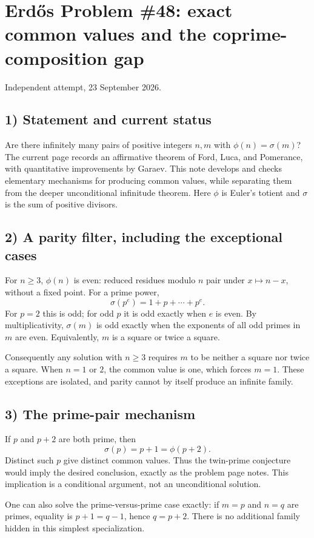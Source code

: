 \section{Erd\H{o}s Problem \#48: exact common values and the coprime-composition gap}
\noindent Independent attempt, 23 September 2026.

\subsection*{1) Statement and current status}
Are there infinitely many pairs of positive integers $n,m$ with $\phi(n)=\sigma(m)$? The current page records an affirmative theorem of Ford, Luca, and Pomerance, with quantitative improvements by Garaev. This note develops and checks elementary mechanisms for producing common values, while separating them from the deeper unconditional infinitude theorem. Here $\phi$ is Euler's totient and $\sigma$ is the sum of positive divisors.

\subsection*{2) A parity filter, including the exceptional cases}
For $n\ge3$, $\phi(n)$ is even: reduced residues modulo $n$ pair under $x\mapsto n-x$, without a fixed point. For a prime power,
\[
 \sigma(p^e)=1+p+\cdots+p^e.
\]
For $p=2$ this is odd; for odd $p$ it is odd exactly when $e$ is even. By multiplicativity, $\sigma(m)$ is odd exactly when the exponents of all odd primes in $m$ are even. Equivalently, $m$ is a square or twice a square.

Consequently any solution with $n\ge3$ requires $m$ to be neither a square nor twice a square. When $n=1$ or $2$, the common value is one, which forces $m=1$. These exceptions are isolated, and parity cannot by itself produce an infinite family.

\subsection*{3) The prime-pair mechanism}
If $p$ and $p+2$ are both prime, then
\[
 \sigma(p)=p+1=\phi(p+2).
\]
Distinct such $p$ give distinct common values. Thus the twin-prime conjecture would imply the desired conclusion, exactly as the problem page notes. This implication is a conditional argument, not an unconditional solution.

One can also solve the prime-versus-prime case exactly: if $m=p$ and $n=q$ are primes, equality is $p+1=q-1$, hence $q=p+2$. There is no additional family hidden in this simplest specialization.

